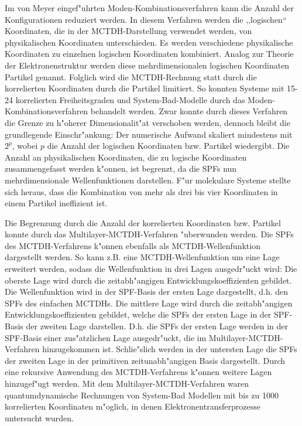  Im von Meyer eingef"uhrten Moden-Kombinationsverfahren kann die Anzahl der Konfigurationen reduziert werden.
In diesem Verfah\-ren werden die ,,logischen`` Koordina\-ten, die in der MCTDH-Darstellung verwendet werden, von physikalischen Koordina\-ten unterschieden. 
Es werden verschiedene physikalische Koordinaten zu einzelnen logi\-schen Koordinaten kombiniert.
Analog zur Theorie der Elektronenstruktur werden diese mehrdimensionalen logischen Koordinaten Partikel genannt. 
Folglich wird die MCTDH-Rechnung statt durch die korrelierten Koordinaten durch die Partikel limitiert. 
So konn\-ten Systeme  mit 15-24 korrelierten Freiheitsgraden \cite{H5O2+MCTDH2, H5O2+MCTDH3, RWMC, CWMC}
und System-Bad-Mo\-del\-le \cite{W, WTM, NM2} durch das Moden-Kombinationsverfahren behandelt werden.
Zwar konnte durch dieses Verfahren die Grenze zu h"oherer Dimensionalit"at verschoben werden,
 dennoch bleibt die grundlegende Einschr"ankung: Der numerische Aufwand skaliert mindestens mit $2^p$, wobei $ p $ die Anzahl der logischen Koordinaten bzw.
 Partikel wiedergibt. Die Anzahl an physikalischen Koordinaten, die zu logische Koordinaten zusammengefasst werden k"onnen, ist begrenzt, da die SPFs
 nun mehrdimensionale Wellenfunktionen darstellen. F"ur molekulare Systeme stellte sich heraus, dass die Kombination von mehr als drei bis vier Koordinaten in einem Partikel
ineffizient ist.

Die Begrenzung durch die Anzahl der korrelierten Koordinaten bzw. Partikel konnte durch das Multilayer-MCTDH-Verfahren \cite{WT3} "uberwunden werden.
Die SPFs des MCTDH-Verfahrens k"onnen ebenfalls als MCTDH-Wellenfunktion dargestellt werden.
So kann z.B. eine MCTDH-Wellenfunktion um eine Lage erweitert werden, sodass die Wellenfunktion in drei Lagen ausgedr"uckt wird:
Die oberste Lage wird durch die zeitabh"angigen Entwicklungskoeffizienten gebildet. Die Wellenfunktion wird in der SPF-Basis der ersten Lage dargestellt, d.h.
den SPFs des einfachen MCTDHs. Die mittlere Lage wird durch die zeitabh"angigen Entwicklungskoeffizienten gebildet, welche die SPFs der ersten Lage in der
SPF-Basis der zweiten Lage darstellen.
D.h. die SPFs der ersten Lage werden in der SPF-Basis einer zus"atzlichen Lage ausgedr"uckt, die im Multilayer-MCTDH-Verfahren hinzugekommen ist. 
Schlie"slich werden in der untersten Lage die SPFs der zweiten Lage in der primitiven zeitunabh"angigen Basis dargestellt.
Durch eine rekursive Anwendung des MCTDH-Verfahrens k"onnen weitere Lagen hinzugef"ugt werden.
Mit dem Multilayer-MCTDH-Verfahren waren quantumdynamische Rechnungen von System-Bad Modellen mit bis zu 1000 korrelierten Koordinaten m"oglich,
in denen Elektronentransferprozesse \cite{WT3, WST} untersucht wurden.

